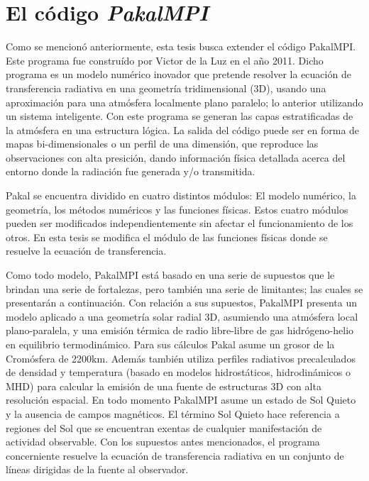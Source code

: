 \documentclass[9pt]{book}
\begin{document}
\section{El c\'odigo \emph{PakalMPI}}
Como se mencion\'o anteriormente, esta tesis busca extender el c\'odigo PakalMPI. Este programa fue constru\'ido por Victor de la Luz en el a\~no 2011\cite{PAKAL}. Dicho programa es un modelo num\'erico inovador que pretende resolver la ecuaci\'on de transferencia radiativa en una geometr\'ia tridimensional (3D), usando una aproximaci\'on para una atm\'osfera localmente plano paralelo; lo anterior utilizando un sistema inteligente. Con este programa se generan las capas estratificadas de la atm\'osfera en una estructura l\'ogica. La salida del c\'odigo puede ser en forma de mapas bi-dimensionales o un perfil de una dimensi\'on, que reproduce las observaciones con alta presici\'on, dando informaci\'on f\'isica detallada acerca del entorno donde la radiaci\'on fue generada y/o transmitida.

Pakal se encuentra dividido en cuatro distintos m\'odulos: El modelo num\'erico, la geometr\'ia, los m\'etodos num\'ericos y las funciones f\'isicas. Estos cuatro m\'odulos pueden ser modificados independientemente sin afectar el funcionamiento de los otros. En esta tesis se modifica el m\'odulo de las funciones f\'isicas donde se resuelve la ecuaci\'on de transferencia.

Como todo modelo, PakalMPI est\'a basado en una serie de supuestos que le brindan una serie de fortalezas, pero tambi\'en una serie de limitantes; las cuales se presentar\'an a continuaci\'on. Con relaci\'on a sus supuestos, PakalMPI presenta un modelo aplicado a una geometr\'ia solar radial 3D, asumiendo una atm\'osfera local plano-paralela, y una emisi\'on t\'ermica de radio libre-libre de gas hidr\'ogeno-helio en equilibrio termodin\'amico. Para sus c\'alculos Pakal asume un grosor de la Crom\'osfera de 2200km. Adem\'as tambi\'en utiliza perfiles radiativos precalculados de densidad y temperatura (basado en modelos hidrost\'aticos, hidrodin\'amicos o MHD) para calcular la emisi\'on de una fuente de estructuras 3D con alta resoluci\'on espacial. En todo momento PakalMPI asume un estado de Sol Quieto y la ausencia de campos magn\'eticos. El t\'ermino Sol Quieto hace referencia a regiones del Sol que se encuentran exentas de cualquier manifestaci\'on de actividad observable. Con los supuestos antes mencionados, el programa concerniente resuelve la ecuaci\'on de transferencia radiativa en un conjunto de l\'ineas dirigidas de la fuente al observador.
\end{document}
